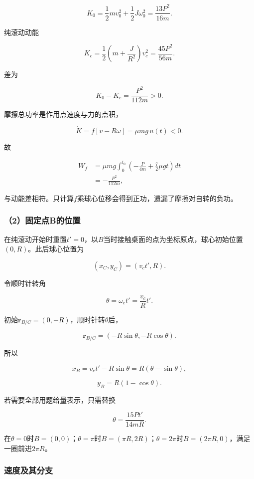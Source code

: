 \documentclass[12pt,a4paper,fontset=fandol]{ctexart}
\begin{document}
\[
K_0=\frac12mv_0^2+\frac12J\omega_0^2
=\frac{13P^2}{16m}.
\]

纯滚动动能

\[
K_c=\frac12\left(m+\frac J{R^2}\right)v_c^2
=\frac{45P^2}{56m}.
\]

差为

\[
\boxed{K_0-K_c=\frac{P^2}{112m}>0}.
\]

摩擦总功率是作用点速度与力的点积，

\[
\dot K=f[v-R\omega]=\mu mg\,u(t)<0.
\]

故

\[
\begin{aligned}
W_f&=\mu mg\int_0^{t_0}
\left(-\frac P{4m}+\frac72\mu gt\right)dt\\
&=-\frac{P^2}{112m},
\end{aligned}
\]

与动能差相符。只计算\(f\)乘球心位移会得到正功，遗漏了摩擦对自转的负功。

\subsubsection{（2）固定点B的位置}\label{ux56faux5b9aux70b9bux7684ux4f4dux7f6e}

在纯滚动开始时重置\(t'=0\)，以\(B\)当时接触桌面的点为坐标原点，球心初始位置\((0,R)\)。此后球心位置为

\[
(x_C,y_C)=(v_ct',R).
\]

令顺时针转角

\[
\theta=\omega_ct'=\frac{v_c}{R}t'.
\]

初始\(\mathbf r_{B/C}=(0,-R)\)，顺时针转\(\theta\)后，

\[
\mathbf r_{B/C}=(-R\sin\theta,-R\cos\theta).
\]

所以

\[
\boxed{
x_B=v_ct'-R\sin\theta
=R(\theta-\sin\theta)},
\]

\[
\boxed{y_B=R(1-\cos\theta)}.
\]

若需要全部用题给量表示，只需替换

\[
\theta=\frac{15Pt'}{14mR}.
\]

在\(\theta=0\)时\(B=(0,0)\)；\(\theta=\pi\)时\(B=(\pi R,2R)\)；\(\theta=2\pi\)时\(B=(2\pi R,0)\)，满足一圈前进\(2\pi R\)。

\subsubsection{速度及其分支}\label{ux901fux5ea6ux53caux5176ux5206ux652f}
\end{document}
